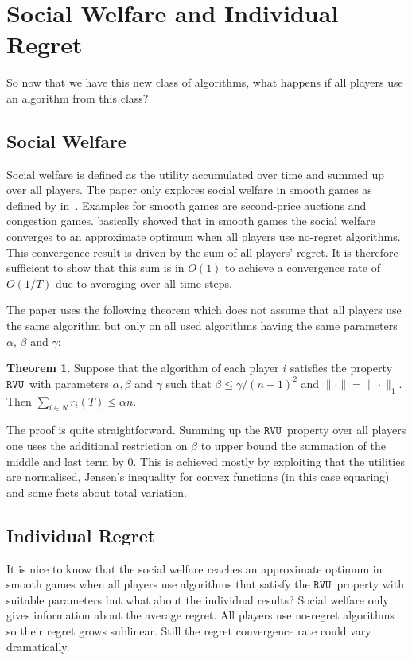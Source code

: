 \documentclass[a4paper]{article}
\theoremstyle{definition}
\newtheorem{theorem}{Theorem}
\newcommand{\myprop}{\ensuremath{\texttt{RVU}}}
\begin{document}
\section{Social Welfare and Individual Regret}
So now that we have this new class of algorithms, what happens if all
players use an algorithm from this class?

\subsection{Social Welfare}
Social welfare is defined as the utility accumulated over time and summed up over all players.
The paper only explores social welfare in smooth games as defined by
\citeauthor{Roughgarden:2009:IRP:1536414.1536485} in~\cite{Roughgarden:2009:IRP:1536414.1536485}.
Examples for smooth games are second-price auctions and congestion
games.
\citeauthor{Roughgarden:2009:IRP:1536414.1536485} basically showed
that in smooth games the social welfare converges to an approximate
optimum when all players use no-regret algorithms.
This convergence result is driven by the sum of all players' regret.
It is therefore sufficient to show that this sum is in $O(1)$
to achieve a convergence rate of $O(1/T)$ due to averaging over all
time steps.

The paper uses the following theorem which does not assume that all
players use the same algorithm but only on all used algorithms having the
same parameters $\alpha$, $\beta$ and $\gamma$:

\begin{theorem}\label{thm:sufficient}
Suppose that the algorithm of each player $i$ satisfies the property
\myprop~with parameters $\alpha, \beta$ and $\gamma$ such that
$\beta\leq \gamma/(n-1)^2$ and $\|\cdot\| = \|\cdot\|_1$. Then
$\sum_{i\in N} r_i(T) \leq \alpha n$.
\end{theorem}


The proof is quite straightforward.
Summing up the \myprop~property over all players one uses the
additional restriction on $\beta$ to upper bound the summation of the
middle and last term by 0. This is achieved mostly by exploiting that
the utilities are normalised, Jensen's
inequality for convex functions (in this case squaring) and some facts
about total variation.


\subsection{Individual Regret}
It is nice to know that the social welfare reaches an approximate
optimum in smooth games when all players use algorithms that satisfy
the \myprop~property with suitable parameters but what about the
individual results?
Social welfare only gives information about the average regret.
All players use no-regret algorithms so their regret grows sublinear.
Still the regret convergence rate could vary dramatically.
\end{document}

